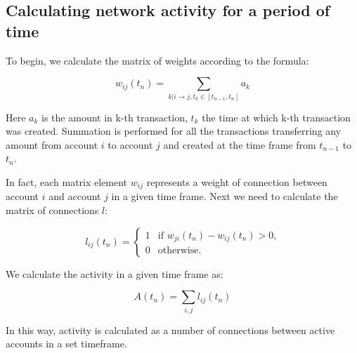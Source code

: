 \documentclass[a4paper,12pt]{article}
\begin{document}

\subsection{Calculating network activity for a period of time}

To begin, we calculate the matrix of weights according to the formula:


$$
w_{ij}(t_n)=\sum_{k|i \to j, t_k \in [t_{n-1}, t_n]}a_k
$$

Here $a_k$  is the amount in k-th transaction, $t_k$  the time at which k-th transaction was created. Summation is performed for all the transactions transferring any amount from account $i$ to account $j$ and created at the time frame from $t_{n-1}$ to $t_n$. 

In fact, each matrix element $w_{ij}$ represents a weight of connection between account $i$ and account $j$ in a given time frame. Next we need to calculate the matrix of connections $l$: 

% 
% 

$$
l_{ij}(t_n) = \begin{cases}
 1
 & \text{if $w_{ji}(t_n)-w_{ij}(t_n) > 0$,}\\
 0 & \text{otherwise.}
\end{cases}
$$

We calculate the activity in a given time frame as:


$$
A(t_n) = \sum_{i,j} l_{ij}(t_n)
$$

In this way, activity is calculated as a number of connections between active accounts in a set timeframe. 
\end{document}
